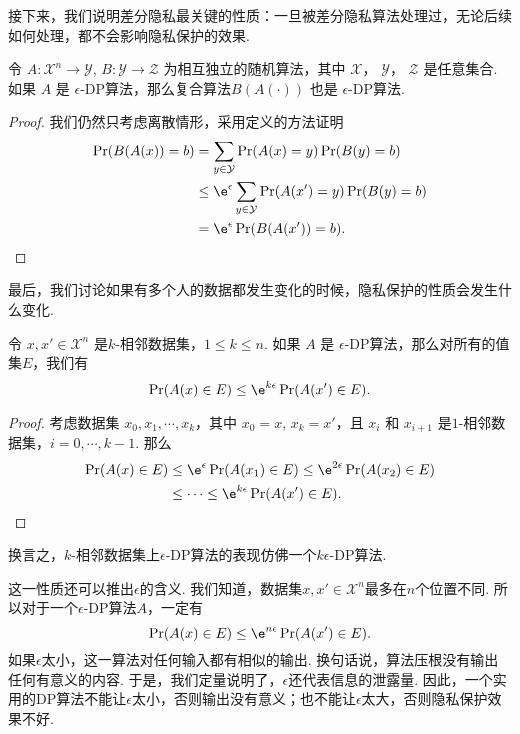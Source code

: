 接下来，我们说明差分隐私最关键的性质：一旦被差分隐私算法处理过，无论后续如何处理，都不会影响隐私保护的效果.

\begin{proposition}[后处理]\label{prop:post-processing}
    令 $A : \mathcal X^n \to \mathcal Y$, $B : \mathcal Y \to \mathcal Z$ 为相互独立的随机算法，其中 $\mathcal X$， $\mathcal Y$， $\mathcal Z$ 是任意集合. 如果 $A$ 是 $\epsilon$-DP算法，那么复合算法$ B(A(\cdot))$ 也是 $\epsilon$-DP算法.
\end{proposition}
\begin{proof}
我们仍然只考虑离散情形，采用定义的方法证明
    \[
    \begin{aligned}
        \Pr(B(A(x)) = b) &= \sum_{y \in \mathcal Y} \Pr(A(x) = y) \Pr(B(y) = b) \\
        &\leq \e^{\epsilon} \sum_{y\in \mathcal Y}\Pr(A(x') = y)\Pr(B(y) = b)\\
        &= \e^{\epsilon}\Pr(B(A(x')) = b).
    \end{aligned}
    \]
\end{proof}

最后，我们讨论如果有多个人的数据都发生变化的时候，隐私保护的性质会发生什么变化. 

\begin{proposition}[群体隐私]\label{prop:group-privacy}
    令 $x, x' \in \mathcal X^n$ 是$k$-相邻数据集，$1 \leq k \leq n$. 如果 $A$ 是 $\epsilon$-DP算法，那么对所有的值集$E$，我们有
    \[
    \Pr(A(x) \in E) \leq \e^{k\epsilon}\Pr(A(x') \in E).
    \]
\end{proposition}
\begin{proof}
    考虑数据集 $x_0, x_1, \cdots , x_k$，其中 $x_0 = x$, $x_k = x'$，且 $x_i$ 和 $x_{i+1}$ 是$1$-相邻数据集，$i = 0, \cdots, k-1$. 那么
    \[
    \begin{aligned}
    \Pr(A(x) \in E) &\leq \e^{\epsilon}\Pr(A(x_1) \in E) \leq \e^{2\epsilon}\Pr(A(x_2) \in E)\\
    &\leq \cdots \leq \e^{k\epsilon}\Pr(A(x') \in E).
    \end{aligned}
    \]
\end{proof}

换言之，$k$-相邻数据集上$\epsilon$-DP算法的表现仿佛一个$k\epsilon$-DP算法. 

这一性质还可以推出$\epsilon$的含义. 我们知道，数据集$x, x' \in \mathcal X^n$最多在$n$个位置不同. 所以对于一个$\epsilon$-DP算法$A$，一定有
        \[
        \Pr(A(x) \in E) \leq \e^{n\epsilon}\Pr(A(x') \in E).
        \]
如果$\epsilon$太小，这一算法对任何输入都有相似的输出. 换句话说，算法压根没有输出任何有意义的内容. 于是，我们定量说明了，$\epsilon$还代表信息的泄露量. 因此，一个实用的DP算法不能让$\epsilon$太小，否则输出没有意义；也不能让$\epsilon$太大，否则隐私保护效果不好.

